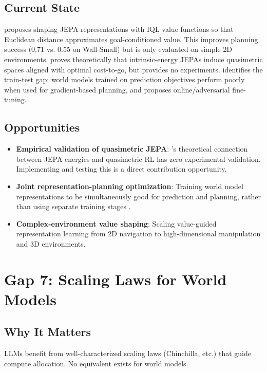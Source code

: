 \documentclass[11pt,a4paper]{article}
\begin{document}
\subsection{Current State}
\citet{destrade2025valueguided} proposes shaping JEPA representations with IQL value functions so that Euclidean distance approximates goal-conditioned value. This improves planning success (0.71 vs. 0.55 on Wall-Small) but is only evaluated on simple 2D environments. \citet{kobanda2026intrinsic} proves theoretically that intrinsic-energy JEPAs induce quasimetric spaces aligned with optimal cost-to-go, but provides no experiments. \citet{parthasarathy2025closing} identifies the train-test gap: world models trained on prediction objectives perform poorly when used for gradient-based planning, and proposes online/adversarial fine-tuning.

\subsection{Opportunities}
\begin{itemize}[noitemsep]
    \item \textbf{Empirical validation of quasimetric JEPA}: \citet{kobanda2026intrinsic}'s theoretical connection between JEPA energies and quasimetric RL has zero experimental validation. Implementing and testing this is a direct contribution opportunity.
    \item \textbf{Joint representation-planning optimization}: Training world model representations to be simultaneously good for prediction and planning, rather than using separate training stages \citep{destrade2025valueguided}.
    \item \textbf{Complex-environment value shaping}: Scaling value-guided representation learning from 2D navigation to high-dimensional manipulation and 3D environments.
\end{itemize}

\section{Gap 7: Scaling Laws for World Models}

\subsection{Why It Matters}
LLMs benefit from well-characterized scaling laws (Chinchilla, etc.) that guide compute allocation. No equivalent exists for world models.
\end{document}
